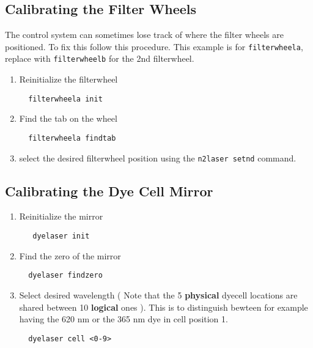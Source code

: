 \subsection{Calibrating the Filter Wheels}
The control system can sometimes lose track
of where the filter wheels are positioned.
To fix this follow this procedure.  This example
is for {\tt filterwheela}, replace with 
{\tt filterwheelb} for the 2nd filterwheel.
\begin{enumerate}
\item Reinitialize the filterwheel
  \begin{verbatim}
  filterwheela init
  \end{verbatim}
\item Find the tab on the wheel
  \begin{verbatim}
  filterwheela findtab
  \end{verbatim}
\item select the desired filterwheel position using
  the {\tt n2laser setnd} command.
\end{enumerate}

\subsection{Calibrating the Dye Cell Mirror}
\begin{enumerate}
\item Reinitialize the mirror
  \begin{verbatim}
   dyelaser init
  \end{verbatim}
\item Find the zero of the mirror
  \begin{verbatim}
  dyelaser findzero
  \end{verbatim}
\item Select desired wavelength ( Note that the 5 {\bf physical} dyecell locations
are shared between 10 {\bf logical} ones ). This is to distinguish bewteen 
for example having the 620 nm or the 365 nm dye in cell position 1.
  \begin{verbatim}
  dyelaser cell <0-9>
  \end{verbatim}
\end{enumerate}



